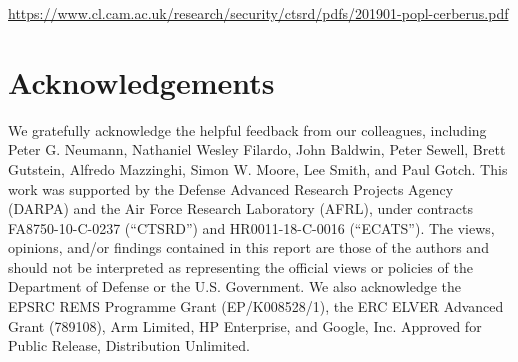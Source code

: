 \documentclass[11pt]{article}
\begin{document}
\smallskip
\noindent
\noindent
\url{https://www.cl.cam.ac.uk/research/security/ctsrd/pdfs/201901-popl-cerberus.pdf}
\smallskip


\section{Acknowledgements}

We gratefully acknowledge the helpful feedback from our colleagues, including
Peter G. Neumann, Nathaniel Wesley Filardo, John Baldwin, Peter Sewell, Brett
Gutstein, Alfredo Mazzinghi, Simon W. Moore, Lee Smith, and Paul Gotch.
This work was supported by the Defense Advanced Research Projects Agency (DARPA) and the Air Force Research Laboratory (AFRL), under contracts
FA8750-10-C-0237 (``CTSRD'') and HR0011-18-C-0016 (``ECATS'').
The views, opinions, and/or findings contained in this report are those of the authors and should not be interpreted as representing the official views or policies of the Department of Defense or the U.S. Government.
We also acknowledge the EPSRC REMS Programme Grant (EP/K008528/1), the
ERC ELVER Advanced Grant (789108), Arm Limited,
HP Enterprise, and Google, Inc.
Approved for Public Release, Distribution Unlimited.
\end{document}
